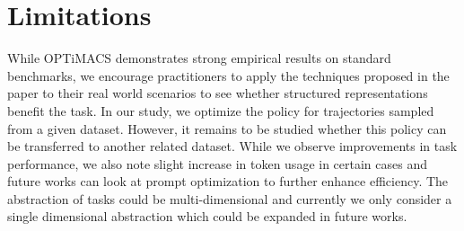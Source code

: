 \documentclass[11pt]{article}
\newcommand{\method}{OPTiMACS\xspace}
\begin{document}
\section{Limitations}
While \method demonstrates strong empirical results on standard benchmarks, we encourage practitioners to apply the techniques proposed in the paper to their real world scenarios to see whether structured representations benefit the task. 
In our study, we optimize the policy for trajectories sampled from a given dataset. However, it remains to be studied whether this policy can be transferred to another related dataset.
While we observe improvements in task performance, we also note slight increase in token usage in certain cases and future works can look at prompt optimization to further enhance efficiency.
The abstraction of tasks could be multi-dimensional and currently we only consider a single dimensional abstraction which could be expanded in future works.


%



\newpage

\appendix


\end{document}
